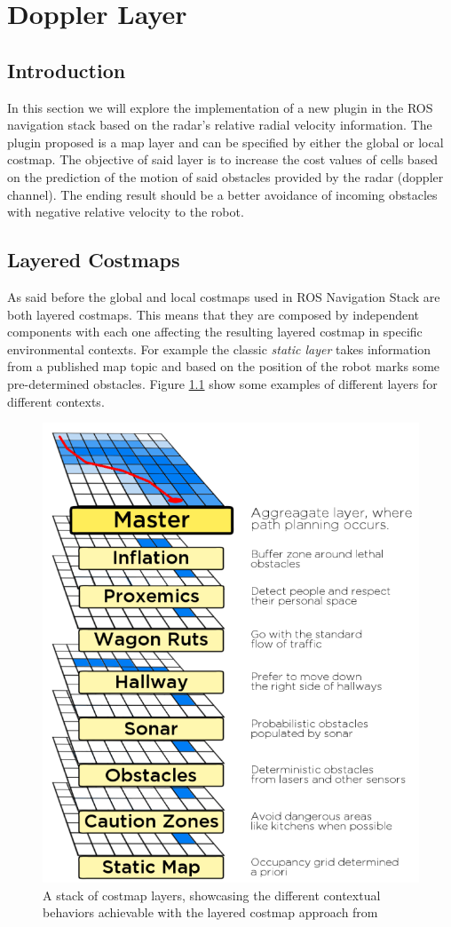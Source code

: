 \chapter{Doppler Layer}

\section{Introduction}
In this section we will explore the implementation of a new plugin in the ROS navigation stack based on the radar's relative radial velocity information. The plugin proposed is a map layer and can be specified by either the global or local costmap. The objective of said layer is to increase the cost values of cells based on the prediction of the motion of said obstacles provided by the radar (doppler channel). The ending result should be a better avoidance of incoming obstacles with negative relative velocity  to the robot.

\section{Layered Costmaps}
As said before the global and local costmaps used in \ac{ROS} Navigation Stack are both layered costmaps.
This means that they are composed by independent components with each one affecting the resulting layered costmap in specific environmental contexts. For example the classic \textit{static layer} takes information from a published map topic and based on the position of the robot marks some  pre-determined obstacles.  Figure \ref{fig::layers} show some examples of different layers for different contexts.
\begin{figure}[h] 
\centerline{\includegraphics [width=0.5 \textwidth]{imgs/chapter6/layers.png}}
\caption{A stack of costmap layers, showcasing the different contextual
behaviors achievable with the layered costmap approach from \cite{lu2014layered}}
\label{fig::layers}
\end{figure}

